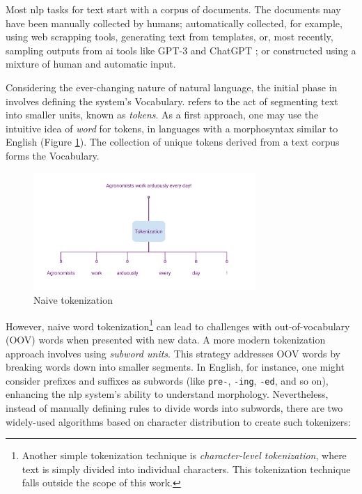 \label{02_tokenization_and_embeddings}

Most \gls{nlp} tasks for text start with a corpus of documents. The documents may have been manually collected by humans; automatically collected, for example, using web scrapping tools, generating text from templates, or, most recently, sampling outputs from \gls{ai} tools like GPT-3  and ChatGPT ; or constructed using a mixture of human and automatic input.

Considering the ever-changing nature of natural language, the initial phase in \textclassification{} involves defining the system's Vocabulary. \emph{\tokenization{}} refers to the act of segmenting text into smaller units, known as \emph{tokens}. As a first approach, one may use the intuitive idea of \emph{word} for tokens, in languages with a morphosyntax similar to English (Figure \ref{fig:naive_tokenization}). The collection of unique tokens derived from a text corpus forms the Vocabulary.

\begin{figure}
    \centering
    \includegraphics[width=0.75\textwidth]{Figures/02/01_Naive_Tokenization.png}
    \caption{Naive tokenization}
    \label{fig:naive_tokenization}
\end{figure}

However, naive word tokenization\footnote{Another simple tokenization technique is \emph{character-level tokenization}, where text is simply divided into individual characters. This tokenization technique falls outside the scope of this work.} can lead to challenges with out-of-vocabulary (OOV) words when presented with new data. 
A more modern tokenization approach involves using \emph{subword units}. This strategy addresses OOV words by breaking words down into smaller segments. In English, for instance, one might consider prefixes and suffixes as subwords (like \texttt{pre-}, \texttt{-ing}, \texttt{-ed}, and so on), enhancing the \gls{nlp} system's ability to understand morphology. Nevertheless, instead of manually defining rules to divide words into subwords, there are two widely-used algorithms based on character distribution to create such tokenizers:


